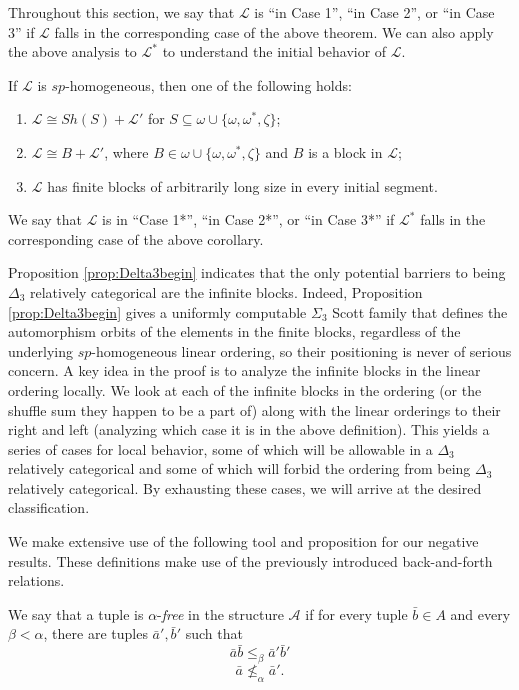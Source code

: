 \documentclass[11pt]{amsart}
\theoremstyle{definition}
\def\A{\mathcal A}
\def\L{\mathcal L}
\begin{document}
Throughout this section, we say that $\L$ is ``in Case 1'', ``in Case 2'', or ``in Case 3'' if $\L$ falls in the corresponding case of the above theorem.
We can also apply the above analysis to $\L^*$ to understand the initial behavior of $\L$.

\begin{corollary}
        If $\L$ is $sp$-homogeneous, then one of the following holds:
    \begin{enumerate}
        \item $\L\cong Sh(S)+\L'$ for $S\subseteq\omega\cup\{\omega,\omega^*,\zeta\}$;
        \item $\L\cong B+\L'$, where $B\in \omega\cup\{\omega,\omega^*,\zeta\}$ and $B$ is a block in $\L$;
        \item $\L$ has finite blocks of arbitrarily long size in every initial segment.
    \end{enumerate}
\end{corollary}

We say that $\L$ is in ``Case 1*'', ``in Case 2*'', or ``in Case 3*'' if $\L^*$ falls in the corresponding case of the above corollary.

Proposition \ref{prop:Delta3begin} indicates that the only potential barriers to being $\Delta_3$ relatively categorical are the infinite blocks.
Indeed, Proposition \ref{prop:Delta3begin} gives a uniformly computable $\Sigma_3$ Scott family that defines the automorphism orbits of the elements in the finite blocks, regardless of the underlying $sp$-homogeneous linear ordering, so their positioning is never of serious concern.
A key idea in the proof is to analyze the infinite blocks in the linear ordering locally.
We look at each of the infinite blocks in the ordering (or the shuffle sum they happen to be a part of) along with the linear orderings to their right and left (analyzing which case it is in the above definition).
This yields a series of cases for local behavior, some of which will be allowable in a $\Delta_3$ relatively categorical and some of which will forbid the ordering from being $\Delta_3$ relatively categorical.
By exhausting these cases, we will arrive at the desired classification.

We make extensive use of the following tool and proposition for our negative results.
These definitions make use of the previously introduced back-and-forth relations.

\begin{definition}[{\cite[Section 17.4]{AK00}}]
We say that a tuple is $\alpha$-\textit{free} in the structure $\A$ if for every tuple $\bar{b}\in A$ and every $\beta<\alpha$, there are tuples $\bar{a}',\bar{b}'$ such that 
\[\bar{a}\bar{b}\leq_\beta\bar{a}'\bar{b}'\]
\[\bar{a}\not\leq_\alpha\bar{a}'.\]
\end{definition}
\end{document}
